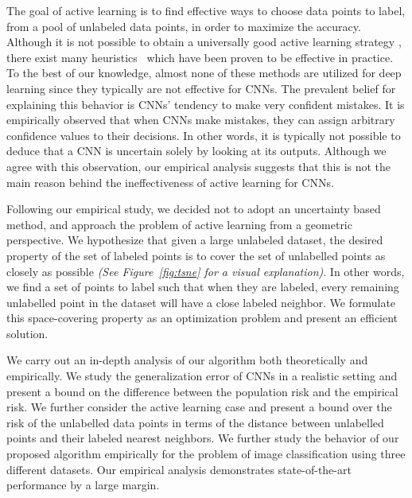 \documentclass{article}
\begin{document}
The goal of active learning is to find effective ways to choose data points to label, from a pool of unlabeled data points, in order to maximize the accuracy. Although it is not possible to obtain a universally good active learning strategy \cite{dasgupta2004analysis}, there exist many heuristics~\cite{settles2010active} which have been proven to be effective in practice. To the best of our knowledge, almost none of these methods are utilized for deep learning since they typically are not effective for CNNs. The prevalent belief for explaining this behavior is CNNs' tendency to make very confident mistakes. It is empirically observed that when CNNs make mistakes, they can assign arbitrary confidence values to their decisions. In other words, it is typically not possible to deduce that a CNN is uncertain solely by looking at its outputs. Although we agree with this observation, our empirical analysis suggests that this is not the main reason behind the ineffectiveness of active learning for CNNs. 

Following our empirical study, we decided not to adopt an uncertainty based method, and approach the problem of active learning from a geometric perspective. We hypothesize that given a large unlabeled dataset, the desired property of the set of labeled points is to cover the set of unlabelled points as closely as possible \emph{(See Figure~\ref{fig:tsne} for a visual explanation)}. In other words, we find a set of points to label such that when they are labeled, every remaining unlabelled point in the dataset will have a close labeled neighbor. We formulate this space-covering property as an optimization problem and present an efficient solution.

We carry out an in-depth analysis of our algorithm both theoretically and empirically. We study the generalization error of CNNs in a realistic setting and present a bound on the difference between the population risk and the empirical risk. We further consider the active learning case and present a bound over the risk of the unlabelled data points in terms of the distance between unlabelled points and their labeled nearest neighbors. We further study the behavior of our proposed algorithm empirically for the problem of image classification using three different datasets. Our empirical analysis demonstrates state-of-the-art performance by a large margin. 

\end{document}
